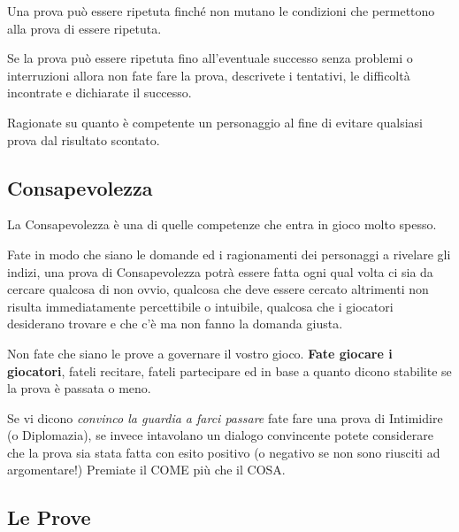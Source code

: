 \begin{multicols}{2}
Una prova può essere ripetuta finché non mutano le condizioni che permettono alla prova di essere ripetuta.

\begin{changemargin}{0.3cm}{0.3cm}\begin{narratore}
Se la prova può essere ripetuta fino all'eventuale successo senza problemi o interruzioni allora non fate fare la prova, descrivete i tentativi, le difficoltà incontrate e dichiarate il successo.
\end{narratore}\end{changemargin}

Ragionate su quanto è competente un personaggio al fine di evitare qualsiasi prova dal risultato scontato.

\subsection{Consapevolezza}\label{consapevolezza2}

La Consapevolezza è una di quelle competenze che entra in gioco molto spesso.

Fate in modo che siano le domande ed i ragionamenti dei personaggi a rivelare gli indizi, una prova di Consapevolezza potrà essere fatta ogni qual volta ci sia da cercare qualcosa di non ovvio, qualcosa che deve essere cercato altrimenti non risulta immediatamente percettibile o intuibile, qualcosa che i giocatori desiderano trovare e che c'è ma non fanno la domanda giusta.

\begin{changemargin}{0.3cm}{0.3cm}\begin{narratore}
Non fate che siano le prove a governare il vostro gioco. \textbf{Fate giocare i giocatori}, fateli recitare, fateli partecipare ed in base a quanto dicono stabilite se la prova è passata o meno.

Se vi dicono \emph{convinco la guardia a farci passare} fate fare una prova di Intimidire (o Diplomazia), se invece intavolano un dialogo convincente potete considerare che la prova sia stata fatta con esito positivo (o negativo se non sono riusciti ad argomentare!) Premiate il COME più che il COSA.
\end{narratore}\end{changemargin}

\subsection{Le Prove}\label{proveopposte}


\end{multicols}
